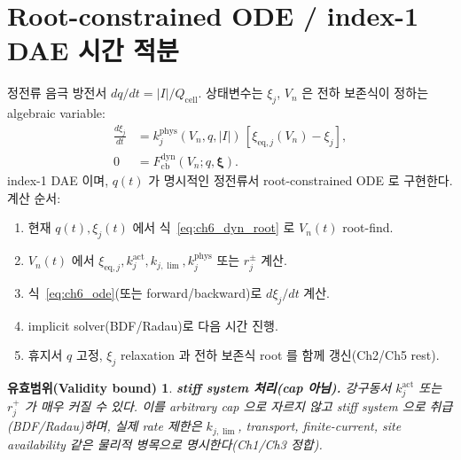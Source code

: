 \documentclass[11pt,a4paper]{article}
\newtheorem*{boundbox}{유효범위(Validity bound)}
\newcommand{\eq}{\mathrm{eq}}
\newcommand{\cell}{\mathrm{cell}}
\newcommand{\cb}{\mathrm{cb}}
\newcommand{\dyn}{\mathrm{dyn}}
\begin{document}
\section{Root-constrained ODE / index-1 DAE 시간 적분}\label{sec:ch6_dae}
정전류 음극 방전서 $dq/dt=|I|/Q_\cell$. 상태변수는 $\xi_j$, $V_n$ 은 전하 보존식이 정하는 algebraic
variable:
\begin{align}
\frac{d\xi_j}{dt}&=k_j^{\mathrm{phys}}(V_n,q,|I|)\,[\xi_{\eq,j}(V_n)-\xi_j],\label{eq:ch6_ode}\\
0&=F_{\cb}^{\dyn}(V_n;q,\bm\xi).\label{eq:ch6_alg}
\end{align}
index-1 DAE 이며, $q(t)$ 가 명시적인 정전류서 root-constrained ODE 로 구현한다. 계산 순서:
\begin{enumerate}[label=T\arabic*),leftmargin=2.2em]
\item 현재 $q(t),\xi_j(t)$ 에서 식~\eqref{eq:ch6_dyn_root} 로 $V_n(t)$ root-find.
\item $V_n(t)$ 에서 $\xi_{\eq,j},k_j^{\mathrm{act}},k_{j,\lim},k_j^{\mathrm{phys}}$ 또는 $r_j^\pm$ 계산.
\item 식~\eqref{eq:ch6_ode}(또는 forward/backward)로 $d\xi_j/dt$ 계산.
\item implicit solver(BDF/Radau)로 다음 시간 진행.
\item 휴지서 $q$ 고정, $\xi_j$ relaxation 과 전하 보존식 root 를 함께 갱신(Ch2/Ch5 rest).
\end{enumerate}
\begin{boundbox}
\textbf{stiff system 처리(cap 아님).} 강구동서 $k_j^{\mathrm{act}}$ 또는 $r_j^+$ 가 매우 커질 수 있다. 이를
arbitrary cap 으로 자르지 않고 stiff system 으로 취급(BDF/Radau)하며, 실제 rate 제한은 $k_{j,\lim}$,
transport, finite-current, site availability 같은 물리적 병목으로 명시한다(Ch1/Ch3 정합).
\end{boundbox}

\end{document}
